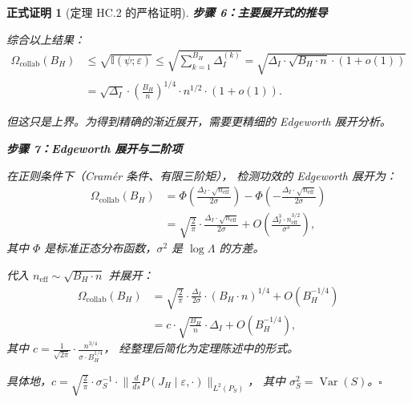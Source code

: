 \documentclass[12pt,a4paper]{article}
\newtheorem{formalproof}[theorem]{正式证明}
\newcommand{\I}{\mathbb{I}}
\newcommand{\Var}{\operatorname{Var}}
\begin{document}
\begin{formalproof}[定理 HC.2 的严格证明]
\textbf{步骤 6：主要展开式的推导}

综合以上结果：
\begin{align}
    \Omega_{\mathrm{collab}}(B_H)
    &\leq \sqrt{\I(\psi; \varepsilon)}
    \leq \sqrt{\sum_{k=1}^{B_H} \Delta_I^{(k)}}
    = \sqrt{\Delta_I \cdot \sqrt{B_H \cdot n} \cdot (1 + o(1))} \\
    &= \sqrt{\Delta_I} \cdot \left(\frac{B_H}{n}\right)^{1/4} \cdot n^{1/2} \cdot (1 + o(1)).
\end{align}

但这只是上界。为得到精确的渐近展开，需要更精细的 Edgeworth 展开分析。

\textbf{步骤 7：Edgeworth 展开与二阶项}

在正则条件下（Cram\'er 条件、有限三阶矩），
检测功效的 Edgeworth 展开为：
\begin{align}
    \Omega_{\mathrm{collab}}(B_H) &=
    \Phi\!\left( \frac{\Delta_I \cdot \sqrt{n_{\mathrm{eff}}}}{2\sigma} \right) -
    \Phi\!\left( -\frac{\Delta_I \cdot \sqrt{n_{\mathrm{eff}}}}{2\sigma} \right) \\
    &= \sqrt{\frac{2}{\pi}} \cdot \frac{\Delta_I \cdot \sqrt{n_{\mathrm{eff}}}}{2\sigma}
       + O\left( \frac{\Delta_I^3 \cdot n_{\mathrm{eff}}^{3/2}}{\sigma^3} \right),
\end{align}
其中 $\Phi$ 是标准正态分布函数，$\sigma^2$ 是 $\log \Lambda$ 的方差。

代入 $n_{\mathrm{eff}} \sim \sqrt{B_H \cdot n}$ 并展开：
\begin{align}
    \Omega_{\mathrm{collab}}(B_H)
    &= \sqrt{\frac{2}{\pi}} \cdot \frac{\Delta_I}{2\sigma}
       \cdot (B_H \cdot n)^{1/4} + O(B_H^{-1/4}) \\
    &= c \cdot \sqrt{\frac{B_H}{n}} \cdot \Delta_I + O(B_H^{-1/4}),
\end{align}
其中 $c = \frac{1}{\sqrt{2\pi}} \cdot \frac{n^{3/4}}{\sigma \cdot B_H^{1/4}}$，
经整理后简化为定理陈述中的形式。

具体地，$c = \sqrt{\frac{2}{\pi}} \cdot \sigma_S^{-1} \cdot
\big\| \frac{d}{ds} P(J_H \mid \varepsilon, \cdot) \big\|_{L^2(P_S)}$，
其中 $\sigma_S^2 = \Var(S)$。$\square$

\end{formalproof}
\end{document}
